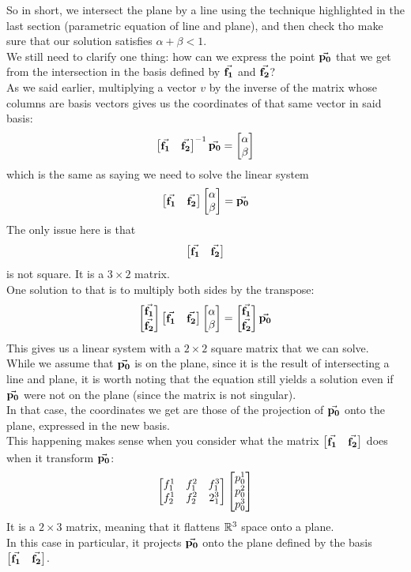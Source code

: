\documentclass[12pt]{article}
\begin{document}
So in short, we intersect the plane by a line
using the technique highlighted in the last section
(parametric equation of line and plane),
and then check tho make sure that our solution
satisfies $\alpha + \beta < 1$. \\

We still need to clarify one thing:
how can we express the point $\vec{\mathbf{p_0}}$
that we get from the intersection
in the basis defined by $\vec{\mathbf{f_1}}$ and $\vec{\mathbf{f_2}}$? \\
As we said earlier,
multiplying a vector $v$ by the inverse 
of the matrix
whose columns are basis vectors
gives us the coordinates
of that same vector in said basis:
\[ \begin{bmatrix} \vec{\mathbf{f_1}} & \vec{\mathbf{f_2}} \end{bmatrix}^{-1}
\vec{\mathbf{p_0}} = \begin{bmatrix} \alpha \\ \beta \end{bmatrix} \]
which is the same as saying we need to 
solve the linear system
\[ \begin{bmatrix} \vec{\mathbf{f_1}} & \vec{\mathbf{f_2}} \end{bmatrix}
\begin{bmatrix} \alpha \\ \beta \end{bmatrix}
= \vec{\mathbf{p_0}} \]
The only issue here is that
\[\begin{bmatrix} \vec{\mathbf{f_1}} & \vec{\mathbf{f_2}} \end{bmatrix}\]
is not square.
It is a $3 \times 2$ matrix. \\
One solution to that is to multiply both sides
by the transpose:
\[ \begin{bmatrix} \vec{\mathbf{f_1}} \\ \vec{\mathbf{f_2}} \end{bmatrix}
 \begin{bmatrix} \vec{\mathbf{f_1}} & \vec{\mathbf{f_2}} \end{bmatrix}
\begin{bmatrix} \alpha \\ \beta \end{bmatrix}
= \begin{bmatrix} \vec{\mathbf{f_1}} \\ \vec{\mathbf{f_2}} \end{bmatrix}\vec{\mathbf{p_0}} \]
This gives us a linear system with a $2 \times 2$
square matrix that we can solve. \\

While we assume that $\vec{\mathbf{p_0}}$ is on the plane,
since it is the result of intersecting a line
and plane,
it is worth noting that the equation still yields
a solution even if $\vec{\mathbf{p_0}}$ were not on the plane
(since the matrix is not singular). \\
In that case, the coordinates we get are those
of the projection of $\vec{\mathbf{p_0}}$ onto the plane,
expressed in the new basis. \\

This happening makes sense when you consider
what the matrix
$\begin{bmatrix} \vec{\mathbf{f_1}} & \vec{\mathbf{f_2}} \end{bmatrix}$
does when it transform $\vec{\mathbf{p_0}}$:
\[ \begin{bmatrix}
    f_1^1 & f_1^2 & f_1^3 \\
    f_2^1 & f_2^2 & 2_1^3
\end{bmatrix} \begin{bmatrix} p_0^1 \\ p_0^2 \\ p_0^3 \end{bmatrix} \]
It is a $2 \times 3$ matrix,
meaning that it flattens $\mathbb{R}^3$
space onto a plane. \\
In this case in particular,
it projects $\vec{\mathbf{p_0}}$ onto the plane
defined by the basis
$\begin{bmatrix} \vec{\mathbf{f_1}} & \vec{\mathbf{f_2}} \end{bmatrix}$. \\
\end{document}
